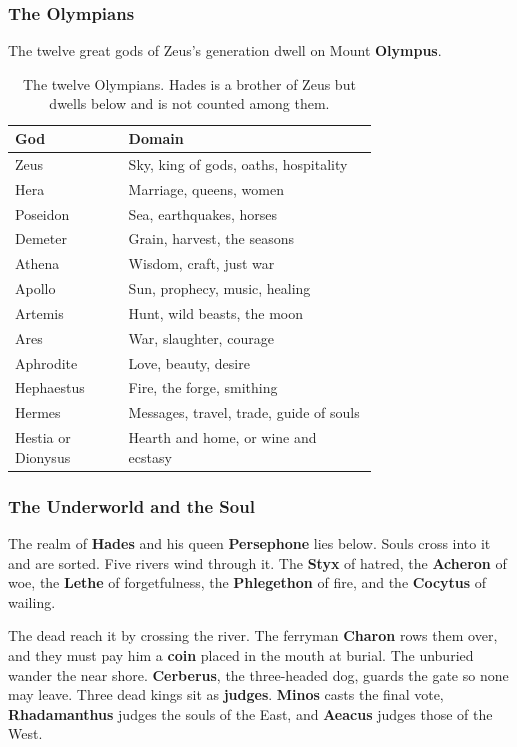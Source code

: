 \subsubsection{The Olympians}

The twelve great gods of Zeus's generation dwell on Mount \textbf{Olympus}.

\begin{longtable}{L{0.22\linewidth} L{0.50\linewidth}}
\caption{The twelve Olympians. Hades is a brother of Zeus but dwells below and is not counted among them.}\\
\toprule
\textbf{God} & \textbf{Domain} \\
\midrule
Zeus & Sky, king of gods, oaths, hospitality \\
Hera & Marriage, queens, women \\
Poseidon & Sea, earthquakes, horses \\
Demeter & Grain, harvest, the seasons \\
Athena & Wisdom, craft, just war \\
Apollo & Sun, prophecy, music, healing \\
Artemis & Hunt, wild beasts, the moon \\
Ares & War, slaughter, courage \\
Aphrodite & Love, beauty, desire \\
Hephaestus & Fire, the forge, smithing \\
Hermes & Messages, travel, trade, guide of souls \\
Hestia or Dionysus & Hearth and home, or wine and ecstasy \\
\bottomrule
\end{longtable}

\subsubsection{The Underworld and the Soul}

The realm of \textbf{Hades} and his queen \textbf{Persephone} lies below. Souls
cross into it and are sorted. Five rivers wind through it. The \textbf{Styx} of
hatred, the \textbf{Acheron} of woe, the \textbf{Lethe} of forgetfulness, the
\textbf{Phlegethon} of fire, and the \textbf{Cocytus} of wailing.

The dead reach it by crossing the river. The ferryman \textbf{Charon} rows them
over, and they must pay him a \textbf{coin} placed in the mouth at burial. The
unburied wander the near shore. \textbf{Cerberus}, the three-headed dog, guards
the gate so none may leave. Three dead kings sit as \textbf{judges}.
\textbf{Minos} casts the final vote, \textbf{Rhadamanthus} judges the souls of the
East, and \textbf{Aeacus} judges those of the West.

